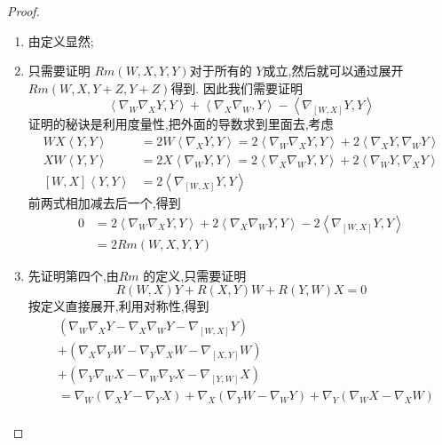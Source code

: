 \documentclass[../../几何与拓扑.tex]{subfiles}
\begin{document}
\begin{proof}
    \begin{enumerate}
        \item 由定义显然;
        \item 只需要证明 \(  Rm\left( W,X,Y,Y \right)   \)对于所有的 \(  Y  \)成立,然后就可以通过展开 \(  Rm\left( W,X,Y+ Z,Y+ Z \right)   \)得到.
           因此我们需要证明 \[
           \left< \nabla _{W} \nabla _{X}Y,Y \right>+ \left< \nabla _{X} \nabla _{W},Y \right>-\left< \nabla _{\left[ W,X \right] }Y,Y \right>
           \]证明的秘诀是利用度量性,把外面的导数求到里面去,考虑 \[
           \begin{aligned}
           WX\left<Y,Y \right>& = 2W\left< \nabla _{X}Y,Y \right>= 2\left< \nabla _{W} \nabla _{X}Y,Y \right>+ 2\left< \nabla _{X}Y, \nabla _{W}Y \right>\\ 
            XW\left<Y,Y \right>& =  2X\left< \nabla _{W}Y,Y \right>= 2\left< \nabla _{X} \nabla _{W}Y,Y \right>+ 2\left< \nabla _{W}Y, \nabla _{X}Y \right> \\ 
             \left[ W,X \right]\left<Y,Y \right>& = 2\left< \nabla _{\left[ W,X \right] }Y,Y \right> 
           \end{aligned}
           \]前两式相加减去后一个,得到 \[
           \begin{aligned}
           0& =  2\left< \nabla _{W} \nabla _{X}Y,Y \right>+ 2\left< \nabla _{X} \nabla _{W}Y,Y \right>-2\left< \nabla _{\left[ W,X \right] }Y,Y \right> \\ 
            & =  2Rm\left( W,X,Y,Y \right) 
           \end{aligned}
           \]
           \item 先证明第四个,由\(  Rm  \) 的定义,只需要证明 \[
           R\left( W,X \right)Y+ R\left( X,Y \right)W+ R\left( Y,W \right)X= 0   
           \]按定义直接展开,利用对称性,得到 \[
           \begin{aligned}
           & \left(  \nabla _{W} \nabla _{X}Y- \nabla _{X} \nabla _{W}Y- \nabla _{\left[ W,X \right] }Y \right)\\ 
            & + \left(  \nabla _{X} \nabla _{Y}W- \nabla _{Y} \nabla _{X}W- \nabla _{\left[ X,Y \right] }W \right)\\ 
             & + \left(  \nabla _{Y} \nabla _{W}X- \nabla _{W} \nabla _{Y}X- \nabla _{\left[ Y,W \right] }X \right)\\ 
              & =  \nabla _{W}\left(  \nabla _{X}Y- \nabla _{Y}X \right)+  \nabla _{X}\left(  \nabla _{Y}W- \nabla _{W}Y \right)+  \nabla _{Y}\left(  \nabla _{W}X- \nabla _{X}W \right)       \\ 

\end{aligned}\]
\end{enumerate}
\end{proof}
\end{document}
